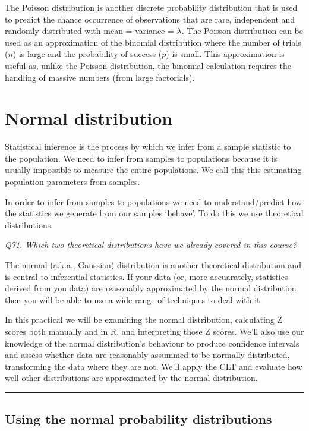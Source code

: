 \documentclass[
  11pt,
  a4paper,
]{book}
\begin{document}
The Poisson distribution is another discrete probability distribution that is used to predict the chance occurrence of observations that are rare, independent and randomly distributed with mean = variance = \(\lambda\). The Poisson distribution can be used as an approximation of the binomial distribution where the number of trials (\(n\)) is large and the probability of success (\(p\)) is small. This approximation is useful as, unlike the Poisson distribution, the binomial calculation requires the handling of massive numbers (from large factorials).

\hypertarget{normal}{%
\chapter{Normal distribution}\label{normal}}

Statistical inference is the process by which we infer from a sample statistic to the population. We need to infer from samples to populations because it is usually impossible to measure the entire populations. We call this this estimating population parameters from samples.

In order to infer from samples to populations we need to understand/predict how the statistics we generate from our samples `behave'. To do this we use theoretical distributions.

\emph{Q71. Which two theoretical distributions have we already covered in this course?}

The normal (a.k.a., Gaussian) distribution is another theoretical distribution and is central to inferential statistics. If your data (or, more accuarately, statistics derived from you data) are reasonably approximated by the normal distribution then you will be able to use a wide range of techniques to deal with it.

In this practical we will be examining the normal distribution, calculating Z scores both manually and in R, and interpreting those Z scores. We'll also use our knowledge of the normal distribution's behaviour to produce confidence intervals and assess whether data are reasonably assummed to be normally distributed, transforming the data where they are not. We'll apply the CLT and evaluate how well other distributions are approximated by the normal distribution.

\begin{center}\rule{0.5\linewidth}{0.5pt}\end{center}

\hypertarget{using-the-normal-probability-distributions}{%
\section{Using the normal probability distributions}\label{using-the-normal-probability-distributions}}
\end{document}
